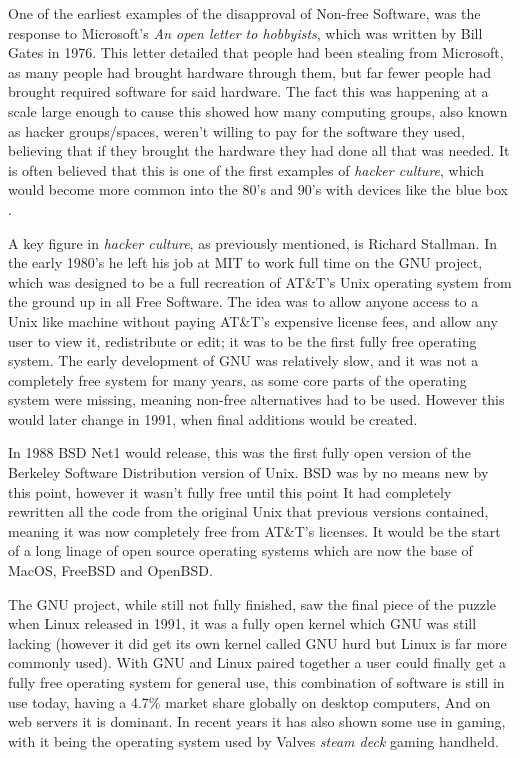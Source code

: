 \documentclass[a4paper,12pt]{article}
\begin{document}
{One of the earliest examples of the disapproval of Non-free Software, was the response to Microsoft's 
\textit{An open letter to hobbyists}, which was written by Bill Gates in 1976. This letter detailed 
that people had been stealing from Microsoft, as many people had brought hardware through 
them, but far fewer people had brought required software for said hardware. The fact this was happening 
at a scale large enough to cause this showed how many computing groups, also known as hacker groups/spaces, 
weren't willing to pay for the software they used, believing that if they brought the hardware they had done 
all that was needed\cite{OPENletter}. It is often believed that this is one of the first examples 
of \textit{hacker culture}, which would become more common into the 80's and 90's with devices like the blue
box \cite{BLUEbox}.

A key figure in \textit{hacker culture}, as previously mentioned, is Richard Stallman. In the 
early 1980's he left his job at MIT to work full time on the GNU project, which was designed
to be a full recreation of AT\&T's Unix operating system from the ground up in all Free Software. 
The idea was to allow anyone access to a Unix like machine without paying AT\&T's expensive license 
fees, and allow any user to view it, redistribute or edit; it was to be the first fully free 
operating system. The early development of GNU was relatively slow, and it was not a completely free 
system for many years, as some core parts of the operating system were missing, meaning non-free 
alternatives had to be used. However this would later change in 1991, when final additions would
be created.

In 1988 BSD Net1 would release\cite{BSDnet1}, this was the first fully open version of the Berkeley 
Software Distribution version of Unix. BSD was by no means new by this point, however it wasn't 
fully free until this point It had completely rewritten all the code from the original 
Unix that previous versions contained, meaning it was now completely free from AT\&T's licenses.
It would be the start of a long linage of open source operating systems which are now the base
of MacOS, FreeBSD and OpenBSD.

The GNU project, while still not fully finished, saw the final piece of the puzzle when 
Linux\cite{LINUX} released in 1991, it was a fully open kernel which GNU was still lacking (however 
it did get its own kernel called GNU hurd but Linux is far more commonly used). With GNU and Linux 
paired together a user could finally get a fully free operating system for general use, this 
combination of software is still in use today, having a 4.7\% market share globally on desktop
computers\cite{LINUXmarket}, And on web servers it is dominant. In recent years it has also shown
some use in gaming, with it being the operating system used by Valves \textit{steam deck} gaming 
handheld\cite{STEAMdeck}.

}
\end{document}
